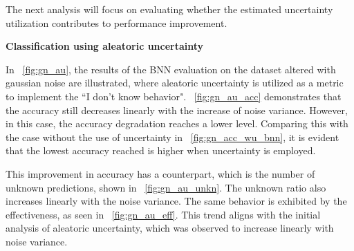 The next analysis will focus on evaluating whether the estimated uncertainty utilization contributes to performance improvement.

\vspace{0.3cm}
\textbf{Classification using aleatoric uncertainty}
\vspace{0.1cm}

In \Fig~\ref{fig:gn_au}, the results of the BNN evaluation on the dataset altered with gaussian noise are illustrated, where aleatoric uncertainty is utilized as a metric to implement the ``I don't know behavior". \Fig~\ref{fig:gn_au_acc} demonstrates that the accuracy still decreases linearly with the increase of noise variance. However, in this case, the accuracy degradation reaches a lower level. Comparing this with the case without the use of uncertainty in \Fig~\ref{fig:gn_acc_wu_bnn}, it is evident that the lowest accuracy reached is higher when uncertainty is employed.

This improvement in accuracy has a counterpart, which is the number of unknown predictions, shown in \Fig~\ref{fig:gn_au_unkn}. The unknown ratio also increases linearly with the noise variance. The same behavior is exhibited by the effectiveness, as seen in \Fig~\ref{fig:gn_au_eff}. This trend aligns with the initial analysis of aleatoric uncertainty, which was observed to increase linearly with noise variance.

